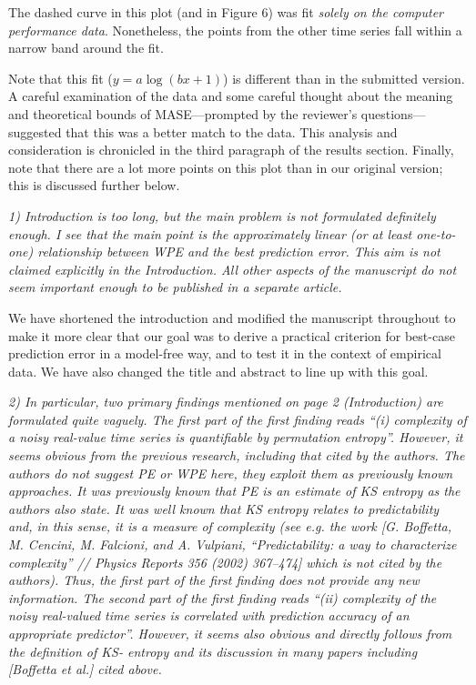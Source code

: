 \documentclass[12pt]{article}
\begin{document}
\noindent The dashed curve in this plot (and in Figure 6) was fit
\emph{solely on the computer performance data}.  Nonetheless, the
points from the other time series fall within a narrow band around the
fit.

Note that this fit ($y = a \log(b x + 1)$) is different than in the
submitted version.  A careful examination of the data and some careful
thought about the meaning and theoretical bounds of MASE---prompted by
the reviewer's questions---suggested that this was a better match to
the data.  This analysis and consideration is chronicled in the third
paragraph of the results section.  Finally, note that there are a lot
more points on this plot than in our original version; this is
discussed further below.

\smallskip

\emph{1) Introduction is too long, but the main problem is not
  formulated definitely enough. I see that the main point is the
  approximately linear (or at least one-to-one) relationship between
  WPE and the best prediction error. This aim is not claimed
  explicitly in the Introduction. All other aspects of the manuscript
  do not seem important enough to be published in a separate article.}

We have shortened the introduction and modified the manuscript
throughout to make it more clear that our goal was to derive a
practical criterion for best-case prediction error in a model-free
way, and to test it in the context of empirical data.  We have also
changed the title and abstract to line up with this goal.

\smallskip

\emph{2) In particular, two primary findings mentioned on page 2
  (Introduction) are formulated quite vaguely. The first part of the
  first finding reads ``(i) complexity of a noisy real-value time
  series is quantifiable by permutation entropy''. However, it seems
  obvious from the previous research, including that cited by the
  authors. The authors do not suggest PE or WPE here, they exploit
  them as previously known approaches. It was previously known that PE
  is an estimate of KS entropy as the authors also state. It was well
  known that KS entropy relates to predictability and, in this sense,
  it is a measure of complexity (see e.g. the work [G. Boffetta,
    M. Cencini, M. Falcioni, and A.  Vulpiani, ``Predictability: a way
    to characterize complexity'' // Physics Reports 356 (2002)
    367–474] which is not cited by the authors). Thus, the first part
  of the first finding does not provide any new information. The
  second part of the first finding reads ``(ii) complexity of the
  noisy real-valued time series is correlated with prediction accuracy
  of an appropriate predictor''.  However, it seems also obvious and
  directly follows from the definition of KS- entropy and its
  discussion in many papers including [Boffetta et al.] cited above.}
\end{document}
